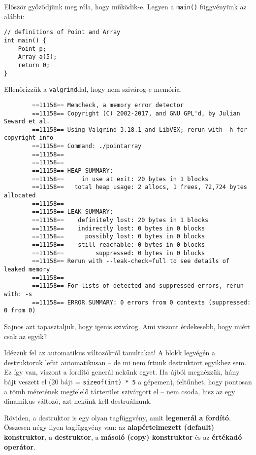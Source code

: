 \documentclass[a4paper, 11pt, oneside]{book}
\makeatletter
\newcommand{\verbatimfontsize}{\small\verbatim@font}
\makeatother
\begin{document}
Először győződjünk meg róla, hogy működik-e. Legyen a \verb*|main()| függvényünk az alábbi:

\begin{lstlisting}[style=cppstyle]
// definitions of Point and Array
int main() {
	Point p;
	Array a(5);
	return 0;
}
\end{lstlisting}

Ellenőrizzük a \verb*|valgrind|dal, hogy nem szivárog-e memória.

\begin{framed}
	\verbatimfontsize
	\begin{verbatim}
		==11158== Memcheck, a memory error detector
		==11158== Copyright (C) 2002-2017, and GNU GPL'd, by Julian Seward et al.
		==11158== Using Valgrind-3.18.1 and LibVEX; rerun with -h for copyright info
		==11158== Command: ./pointarray
		==11158== 
		==11158== 
		==11158== HEAP SUMMARY:
		==11158==     in use at exit: 20 bytes in 1 blocks
		==11158==   total heap usage: 2 allocs, 1 frees, 72,724 bytes allocated
		==11158== 
		==11158== LEAK SUMMARY:
		==11158==    definitely lost: 20 bytes in 1 blocks
		==11158==    indirectly lost: 0 bytes in 0 blocks
		==11158==      possibly lost: 0 bytes in 0 blocks
		==11158==    still reachable: 0 bytes in 0 blocks
		==11158==         suppressed: 0 bytes in 0 blocks
		==11158== Rerun with --leak-check=full to see details of leaked memory
		==11158== 
		==11158== For lists of detected and suppressed errors, rerun with: -s
		==11158== ERROR SUMMARY: 0 errors from 0 contexts (suppressed: 0 from 0)
	\end{verbatim}
\end{framed}

Sajnos azt tapasztaljuk, hogy igenis szivárog. Ami viszont érdekesebb, hogy miért csak az egyik?

Idézzük fel az automatikus változókról tanultakat! A blokk legvégén a destruktoruk lefut automatikusan -- de mi nem írtunk destruktort egyikhez sem. Ez így van, viszont a fordító generál nekünk egyet. Ha újból megnézzük, hány bájt veszett el (20 bájt = \verb|sizeof(int) * 5| a gépemen), feltűnhet, hogy pontosan a tömb méretének megfelelő tárterület szivárgott el -- nem csoda, hisz az egy dinamikus változó, azt nekünk kell destruálnunk.

Röviden, a destruktor is egy olyan tagfüggvény, amit \textbf{legenerál a fordító}. Összesen négy ilyen tagfüggvény van: az \textbf{alapértelmezett (default) konstruktor}, a \textbf{destruktor}, a \textbf{másoló (copy) konstruktor} és az \textbf{értékadó operátor}.
\end{document}
